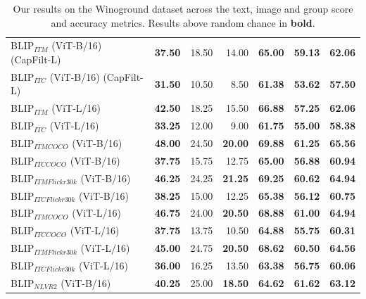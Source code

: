 \begin{table}[ht]
\begin{adjustbox}{max width=0.6\textwidth}
\begin{tabular}{l|rrr|rrr}
 BLIP$_{ITM}$ (ViT-B/16) (CapFilt-L) & \textbf{37.50} & 18.50          & 14.00          & \textbf{65.00} & \textbf{59.13} & \textbf{62.06} \\
 BLIP$_{ITC}$ (ViT-B/16) (CapFilt-L) & \textbf{31.50} & 10.50          & 8.50           & \textbf{61.38} & \textbf{53.62} & \textbf{57.50} \\
 BLIP$_{ITM}$ (ViT-L/16)             & \textbf{42.50} & 18.25          & 15.50          & \textbf{66.88} & \textbf{57.25} & \textbf{62.06} \\
 BLIP$_{ITC}$ (ViT-L/16)             & \textbf{33.25} & 12.00          & 9.00           & \textbf{61.75} & \textbf{55.00} & \textbf{58.38} \\
 BLIP$_{ITM COCO}$ (ViT-B/16)        & \textbf{48.00} & 24.50          & \textbf{20.00} & \textbf{69.88} & \textbf{61.25} & \textbf{65.56} \\
 BLIP$_{ITC COCO}$ (ViT-B/16)        & \textbf{37.75} & 15.75          & 12.75          & \textbf{65.00} & \textbf{56.88} & \textbf{60.94} \\
 BLIP$_{ITM Flickr30k}$ (ViT-B/16)   & \textbf{46.25} & 24.25          & \textbf{21.25} & \textbf{69.25} & \textbf{60.62} & \textbf{64.94} \\
 BLIP$_{ITC Flickr30k}$ (ViT-B/16)   & \textbf{38.25} & 15.00          & 12.25          & \textbf{65.38} & \textbf{56.12} & \textbf{60.75} \\
 BLIP$_{ITM COCO}$ (ViT-L/16)        & \textbf{46.75} & 24.00          & \textbf{20.50} & \textbf{68.88} & \textbf{61.00} & \textbf{64.94} \\
 BLIP$_{ITC COCO}$ (ViT-L/16)        & \textbf{37.75} & 13.75          & 10.50          & \textbf{64.88} & \textbf{55.75} & \textbf{60.31} \\
 BLIP$_{ITM Flickr30k}$ (ViT-L/16)   & \textbf{45.00} & 24.75          & \textbf{20.50} & \textbf{68.62} & \textbf{60.50} & \textbf{64.56} \\
 BLIP$_{ITC Flickr30k}$ (ViT-L/16)   & \textbf{36.00} & 16.25          & 13.50          & \textbf{63.38} & \textbf{56.75} & \textbf{60.06} \\
 BLIP$_{NLVR2}$ (ViT-B/16)           & \textbf{40.25} & 25.00          & \textbf{18.50} & \textbf{64.62} & \textbf{61.62} & \textbf{63.12} \\
\bottomrule
\end{tabular}
\end{adjustbox}
\caption{Our results on the Winoground dataset across the text, image and group score and accuracy metrics. Results above random chance in \textbf{bold}.}
\label{tab:results_aggr_ours}
\end{table}

